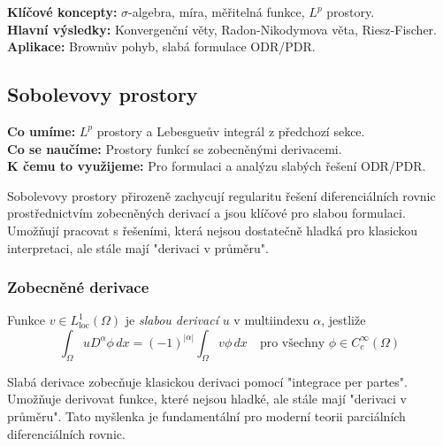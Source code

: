 \begin{summary}
\textbf{Klíčové koncepty:} $\sigma$-algebra, míra, měřitelná funkce, $L^p$ prostory. \\
\textbf{Hlavní výsledky:} Konvergenční věty, Radon-Nikodymova věta, Riesz-Fischer. \\
\textbf{Aplikace:} Brownův pohyb, slabá formulace ODR/PDR.
\end{summary}

\spc

\subsection{Sobolevovy prostory}

\begin{scaffold}
\textbf{Co umíme:} $L^p$ prostory a Lebesgueův integrál z předchozí sekce. \\
\textbf{Co se naučíme:} Prostory funkcí se zobecněnými derivacemi. \\
\textbf{K čemu to využijeme:} Pro formulaci a analýzu slabých řešení ODR/PDR.
\end{scaffold}

\begin{motivation}
Sobolevovy prostory přirozeně zachycují regularitu řešení diferenciálních rovnic prostřednictvím zobecněných derivací a jsou klíčové pro slabou formulaci. Umožňují pracovat s řešeními, která nejsou dostatečně hladká pro klasickou interpretaci, ale stále mají "derivaci v průměru".
\end{motivation}

\subsubsection{Zobecněné derivace}

\begin{definition}
Funkce $v \in L^1_{\text{loc}}(\Omega)$ je \emph{slabou derivací} $u$ v multiindexu $\alpha$, jestliže
\[
\int_\Omega u D^\alpha \phi \, dx = (-1)^{|\alpha|} \int_\Omega v \phi \, dx \quad \text{pro všechny } \phi \in C_c^\infty(\Omega)
\]
\end{definition}

\begin{intuition}
Slabá derivace zobecňuje klasickou derivaci pomocí "integrace per partes". Umožňuje derivovat funkce, které nejsou hladké, ale stále mají "derivaci v průměru". Tato myšlenka je fundamentální pro moderní teorii parciálních diferenciálních rovnic.
\end{intuition}


